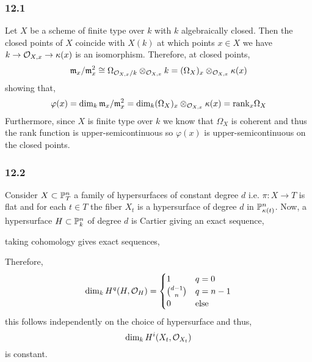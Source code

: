 \documentclass[12pt]{article}
\begin{document}
\subsubsection{12.1}

Let $X$ be a scheme of finite type over $k$ with $k$ algebraically closed. Then the closed points of $X$ coincide with $X(k)$ at which points $x \in X$ we have $k \to \stalk{X}{x} \to \kappa(x)$ is an isomorphism. Therefore, at closed points,
\[ \m_x / \m_x^2 \cong \Omega_{\stalk{X}{x}/k} \otimes_{\stalk{X}{x}} k = (\Omega_X)_x \otimes_{\stalk{X}{x}} \kappa(x) \]
showing that,
\[ \varphi(x) = \dim_k \m_x / \m_x^2 = \dim_k(\Omega_X)_x \otimes_{\stalk{X}{x}} \kappa(x) = \rank_x \Omega_X \]
Furthermore, since $X$ is finite type over $k$ we know that $\Omega_X$ is coherent and thus the rank function is upper-semicontinuous so $\varphi(x)$ is upper-semicontinuous on the closed points.

\subsubsection{12.2}

Consider $X \subset \P^n_T$ a family of hypersurfaces of constant degree $d$ i.e. $\pi : X \to T$ is flat and for each $t \in T$ the fiber $X_t$ is a hypersurface of degree $d$ in $\P^n_{\kappa(t)}$. Now, a hypersurface $H \subset \P^n_k$ of degree $d$ is Cartier giving an exact sequence,
\begin{center}
\end{center}
taking cohomology gives exact sequences,
\begin{center}
\end{center}
Therefore,
\[ \dim_k H^{q}(H, \struct{H}) = \begin{cases}
1 & q = 0
\\
{d - 1 \choose n } & q = n-1
\\
0 & \text{else}
\end{cases} \] 
this follows independently on the choice of hypersurface and thus,
\[ \dim_k H^i(X_t, \struct{X_t}) \]
is constant.
\end{document}
